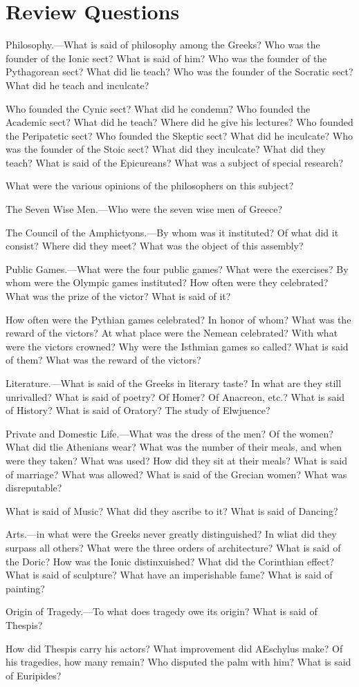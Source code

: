 \documentclass[openany,a4paper]{memoir}
\begin{document}
\section{Review Questions}

Philosophy.---What is said of philosophy among the 
Greeks? Who was the founder of the Ionic sect? What is said of him? 
Who was the founder of the Pythagorean sect? What did lie teach? 
Who was the founder of the Socratic sect? What did he teach and inculcate? 


Who founded the Cynic sect? What did he condemn? Who 
founded the Academic sect? What did he teach? Where did he 
give his lectures? Who founded the Peripatetic sect? Who founded 
the Skeptic sect? What did he inculcate? Who was the founder of 
the Stoic sect? What did they inculcate? What did they teach? 
What is said of the Epicureans? What was a subject of special research? 

What were the various opinions of the philosophers on this subject? 

The Seven Wise Men.---Who were the seven wise men of Greece? 

The Council of the Amphictyons.---By whom was it instituted? 
Of what did it consist? Where did they meet? What was the object 
of this assembly? 

Public Games.---What were the four public games? What were 
the exercises? By whom were the Olympic games instituted? How 
often were they celebrated? What was the prize of the victor? What 
is said of it? 

How often were the Pythian games celebrated? In honor of whom? 
What was the reward of the victors? At what place were the Nemean 
celebrated? With what were the victors crowned? Why were the 
Isthmian games so called? What is said of them? What was the 
reward of the victors? 

Literature.---What is said of the Greeks in literary taste? In 
what are they still unrivalled? What is said of poetry? Of Homer? 
Of Anacreon, etc.? What is said of History? What is said of Oratory? The study of Elwjuence? 

Private and Domestic Life.---What was the dress of the men? 
Of the women? What did tlie Athenians wear? What was the 
number of their meals, and when were they taken? What was used? 
How did they sit at their meals? What is said of marriage? What 
was allowed? What is said of the Grecian women? What was disreputable? 

What is said of Music? What did they ascribe to it? What is said 
of Dancing? 

Arts.---in what were the Greeks never greatly distinguished? In 
wliat did they surpass all others? What were the three orders of architecture? What is said of the Doric? How was the Ionic distinxuished? 
What did the Corinthian effect? What is said of sculpture? What have 
an imperishable fame? What is said of painting? 

Origin of Tragedy.---To what does tragedy owe its origin? What 
is said of Thespis? 

How did Thespis carry his actors? What improvement did AEschylus 
make? Of his tragedies, how many remain? Who disputed the palm 
with him? What is said of Euripides? 
\end{document}

